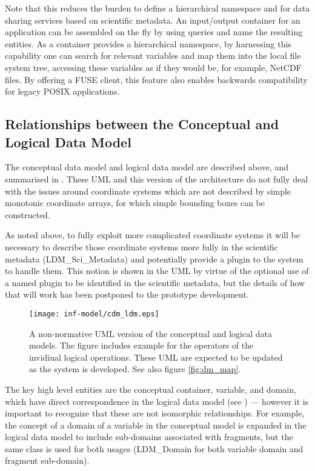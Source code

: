 Note that this reduces the burden to define a hierarchical namespace and for data sharing services based on scientific metadata.
An input/output container for an application can be assembled on the fly by using queries and name the resulting entities.
As a container provides a hierarchical namespace,
by harnessing this capability one can search for relevant variables and map them into the local file system tree, accessing these variables as if they would be, for example, NetCDF files.
By offering a FUSE client, this feature also enables backwards compatibility for legacy POSIX applications.



\subsection{Relationships between the Conceptual and Logical Data Model}
\label{subsec-mapping}

The conceptual data model and logical data model are described above, and summarised in .
These UML and this version of the architecture do not fully deal with the issues around coordinate systems which are not described by simple monotonic coordinate arrays, for which simple bounding boxes can be constructed.

As noted above, to fully exploit more complicated coordinate systems it will be necessary to describe those coordinate systems more fully in the scientific metadata (LDM\_Sci\_Metadata) and potentially provide a plugin to the system to handle them.
This notion is shown in the UML by virtue of the optional use of a named plugin to be identified in the scientific metadata, but the details of how that will work has been postponed to the prototype development.

\begin{figure}
	\centering
	\texttt{[image: inf-model/cdm\_ldm.eps]}
	\caption{A non-normative UML version of the conceptual and logical data models.
	The figure includes example for the operators of the invidiual logical operations.
	These UML are expected to be updated as the system is developed.  See also figure \ref{fig:dm_map}.}
	\label{fig:cdm_ldm}
\end{figure}

The key high level entities are the conceptual container, variable, and domain, which have direct correspondence in the logical
data model (see ) --- however it is important to recognize that these are not isomorphic relationships. For example,
the concept of a domain of a variable in the conceptual model is expanded in the logical data model to include sub-domains associated
with fragments, but the same class is used for both usages (LDM\_Domain for both variable domain and fragment sub-domain).

